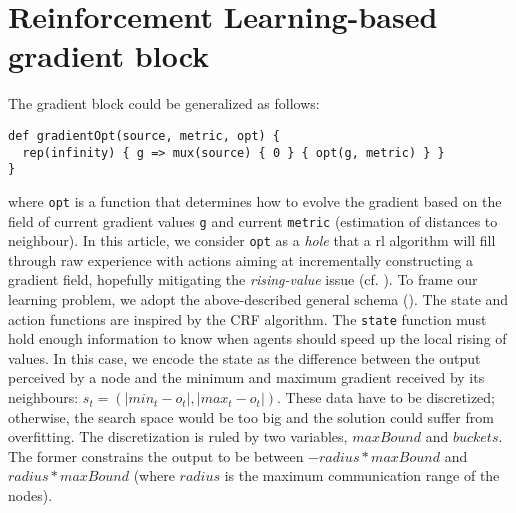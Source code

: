 \section{Reinforcement Learning-based gradient block}

The gradient block could be generalized as follows:
\begin{lstlisting}
def gradientOpt(source, metric, opt) {
  rep(infinity) { g => mux(source) { 0 } { opt(g, metric) } }
}
\end{lstlisting}
where \lstinline|opt| is a function that determines how to evolve the gradient based on the field of current gradient values \lstinline|g| and current \lstinline|metric| (estimation of distances to neighbour). 
In this article, we consider \lstinline|opt| as a \emph{hole} that a \ac{rl} algorithm will fill through raw experience
 with actions aiming at incrementally constructing a gradient field, hopefully mitigating the \emph{rising-value} issue (cf. ).
%
To frame our learning problem, we adopt the above-described general schema (). The state and action functions are inspired by the CRF algorithm.
%
The \lstinline|state| function must hold enough information to know when agents should speed up the local rising of values.
%
In this case, we encode the state as the difference between the output perceived by a node and the minimum and maximum gradient received by its neighbours: $s_t = (|min_t - o_t|, |max_t - o_t|)$. 
%
These data have to be discretized; otherwise, the search space would be too big and the solution could suffer from overfitting. 
%
The discretization is ruled by two variables, $maxBound$ and $buckets$. 
%
The former constrains the output to be between $ - radius * maxBound$ and $ radius * maxBound $ (where $radius$ is the maximum communication range of the nodes). 
